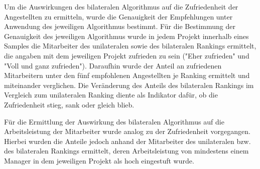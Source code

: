 Um die Auswirkungen des bilateralen Algorithmus auf die Zufriedenheit der Angestellten zu ermitteln, wurde die Genauigkeit der Empfehlungen unter Anwendung des jeweiligen Algorithmus bestimmt.
Für die Bestimmung der Genauigkeit des jeweiligen Algorithmus wurde in jedem Projekt innerhalb eines Samples die Mitarbeiter des unilateralen sowie des bilateralen Rankings ermittelt, die angaben mit dem jeweiligen Projekt zufrieden zu sein ("Eher zufrieden" und "Voll und ganz zufrieden").
Daraufhin wurde der Anteil an zufriedenen Mitarbeitern unter den fünf empfohlenen Angestellten je Ranking ermittelt und miteinander verglichen.
Die Veränderung des Anteils des bilateralen Rankings im Vergleich zum unilateralen Ranking diente als Indikator dafür, ob die Zufriedenheit stieg, sank oder gleich blieb.

Für die Ermittlung der Auswirkung des bilateralen Algorithmus auf die Arbeitsleistung der Mitarbeiter wurde analog zu der Zufriedenheit vorgegangen.
Hierbei wurden die Anteile jedoch anhand der Mitarbeiter des unilateralen bzw. des bilateralen Rankings ermittelt, deren Arbeitsleistung von mindestens einem Manager in dem jeweiligen Projekt als hoch eingestuft wurde.



